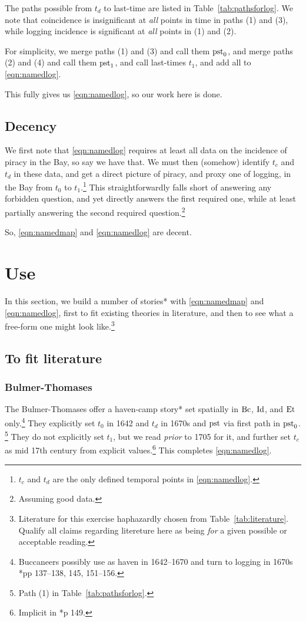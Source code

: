 			The paths possible from \(t_d\) to last-time are listed in Table~\ref{tab:pathsforlog}. We note that coincidence is insignificant at \emph{all} points in time in paths (1) and (3), while logging incidence is significant at \emph{all} points in (1) and (2).
			
			For simplicity, we merge paths (1) and (3) and call them \(\operatorname{pst}_0\), and merge paths (2) and (4) and call them \(\operatorname{pst}_1\), and call last-times \(t_1\), and add all to \ref{eqn:namedlog}. 
			
			This fully gives us \ref{eqn:namedlog}, so our work here is done.
	\subsection{Decency}
	\label{ss:decency}
		We first note that \ref{eqn:namedlog} requires at least all data on the incidence of piracy in the Bay, so say we have that. We must then (somehow) identify \(t_c\) and \(t_d\) in these data, and get a direct picture of piracy, and proxy one of logging, in the Bay from \(t_0\) to \(t_1\).\footnote{\(t_c\) and \(t_d\) are the only defined temporal points in \ref{eqn:namedlog}.} This straightforwardly falls short of answering any forbidden question, and yet directly answers the first required one, while at least partially answering the second required question.\footnote{Assuming good data.}
		
		So, \ref{eqn:namedmap} and \ref{eqn:namedlog} are decent.
%
%
%
\section{Use}
\label{s:use}
	In this section, we build a number of stories* with \ref{eqn:namedmap} and \ref{eqn:namedlog}, first to fit existing theories in literature, and then to see what a free-form one might look like.\footnote{Literature for this exercise haphazardly chosen from Table~\ref{tab:literature}. Qualify all claims regarding litereture here as being \emph{for} a given possible or acceptable reading.}
	\subsection{To fit literature}
	\label{ss:litstories}
		\subsubsection{Bulmer-Thomases}
		\label{sss:bulmers}
		The Bulmer-Thomases offer a haven-camp story* set spatially in \(\operatorname{Bc}\), \(\operatorname{Id}\), and \(\operatorname{Et}\) only.\footnote{Buccaneers possibly use as haven in 1642--1670 and turn to logging in 1670s \cite{bul16}*{pp 137--138, 145, 151--156}.} They explicitly set \(t_0\) in 1642 and \(t_d\) in 1670s and \(\operatorname{pst}\) via first path in \(\operatorname{pst}_0\). \footnote{Path (1) in Table~\ref{tab:pathsforlog}.} They do not explicitly set \(t_1\), but we read \emph{prior} to 1705 for it, and further set \(t_c\) as mid 17th century from explicit values.\footnote{Implicit in \cite{bul16}*{p 149}.} This completes \ref{eqn:namedlog}.
